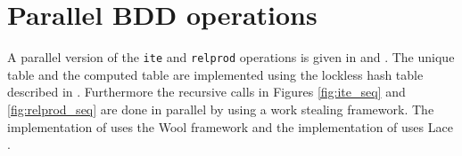 \section{Parallel BDD operations}
A parallel version of the \texttt{ite} and \texttt{relprod} operations is given in \cite{dijk2012parallelization} and \cite{sylvan_multicore_bdd}. The unique table and the computed table are implemented using the lockless hash table described in \cite{so73119}. Furthermore the recursive calls in Figures \ref{fig:ite_seq} and \ref{fig:relprod_seq} are done in parallel by using a work stealing framework. The implementation of \cite{dijk2012parallelization} uses the Wool framework \cite{faxen2010efficient} and the implementation of \cite{sylvan_multicore_bdd} uses Lace \cite{dijk2013lace}.